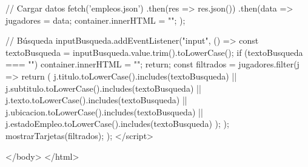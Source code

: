     // Cargar datos
    fetch('empleos.json')
      .then(res => res.json())
      .then(data => {
        jugadores = data;
        container.innerHTML = "";
      });

    // Búsqueda
    inputBusqueda.addEventListener("input", () => {
      const textoBusqueda = inputBusqueda.value.trim().toLowerCase();
      if (textoBusqueda === "") {
        container.innerHTML = "";
        return;
      }
      const filtrados = jugadores.filter(j => {
        return (
          j.titulo.toLowerCase().includes(textoBusqueda) ||
          j.subtitulo.toLowerCase().includes(textoBusqueda) ||
          j.texto.toLowerCase().includes(textoBusqueda) ||
          j.ubicacion.toLowerCase().includes(textoBusqueda) ||
          j.estadoEmpleo.toLowerCase().includes(textoBusqueda)
        );
      });
      mostrarTarjetas(filtrados);
    });
  </script>

</body>
</html>






